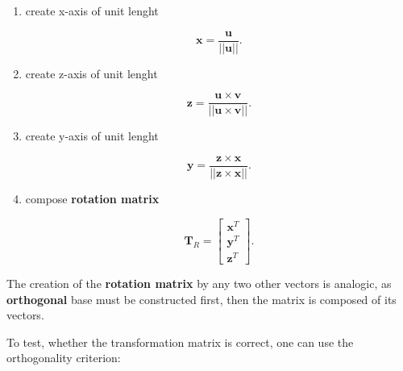 \begin{enumerate}
\begin{bbox}[0.85]
            \begin{enumerate}
                \item create x-axis of unit lenght

                    \begin{equation}
                        \mathbf{x} = \frac{\mathbf{u}}{||\mathbf{u}||}
                    .\end{equation}

                \item create z-axis of unit lenght

                    \begin{equation}
                        \mathbf{z}
                        = \frac{\mathbf{u} \times \mathbf{v}}{||\mathbf{u} \times \mathbf{v}||}
                    .\end{equation}

                \item create y-axis of unit lenght

                    \begin{equation}
                        \mathbf{y}
                        = \frac{\mathbf{z} \times \mathbf{x}}{||\mathbf{z} \times \mathbf{x}||}
                    .\end{equation}

                \item compose \textbf{rotation matrix}

                    \begin{equation}
                        \mathbf{T}_{R} = \begin{bmatrix}
                            \mathbf{x}^{T} \\
                            \mathbf{y}^{T} \\
                            \mathbf{z}^{T}
                        \end{bmatrix}
                    .\end{equation}
            \end{enumerate}

            The creation of the \textbf{rotation matrix} by any two other vectors is
            analogic, as \textbf{orthogonal} base must be constructed first, then
            the matrix is composed of its vectors.
        \end{bbox}

        \begin{bbox}[0.85]
            To test, whether the transformation matrix is correct, one can use
            the orthogonality criterion:


\end{bbox}
\end{enumerate}
